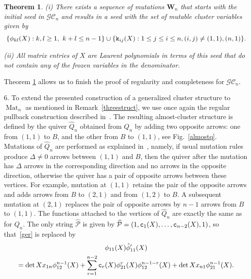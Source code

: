 \documentclass{amsart}
\newtheorem{theorem}{Theorem}
\theoremstyle{definition}
\theoremstyle{remark}
\numberwithin{equation}{section}
\numberwithin{theorem}{section}
\def\CC{{\mathcal C}}
\def\G{{\mathcal G}}
\def\P{{\mathcal P}}
\def\Ws{\mathbf W}
\def\ec{{\tt c}}
\def\ek{{\tt k}}
\def\Mat{\operatorname{Mat}}
\begin{document}
\begin{theorem}
\label{fish_to_cuttlefish}
{\rm (i)} There exists a sequence of mutations $\Ws_n$ that starts with the initial seed in $\G\CC_{n}$ and results in a seed with the set of mutable cluster variables given by 
\[
\{\phi_{kl}(X): k,l \geq 1, \ k+l \leq n-1 \}\cup \{\ek_{ij}(X) : 1\le j \leq i \leq n, (i,j)\ne (1,1), (n,1) \}.
\]

{\rm (ii)} All matrix entries of $X$ are Laurent polynomials in terms of this seed that do not contain any of the frozen variables in the denominator.
\end{theorem}


Theorem \ref{fish_to_cuttlefish} allows us to finish the proof of regularity and completeness for $\G\CC_{n}$.

6. To extend the presented construction of a generalized cluster structure to $\Mat_n$ as mentioned in Remark~\ref{threestruct}, we use once again the regular pullback construction described in~\cite{GSVpullback}. The resulting  almost-cluster structure is defined by 
the quiver $\widehat Q_n$ obtained from $Q_n$ by adding two opposite arrows: one from $(1,1)$ to $B$, and the other from $B$ to $(1,1)$, see Fig.~\ref{almostq}. 
Mutations of $\widehat Q_n$ are performed as explained 
in~\cite[Remark 4.6]{GSVpullback}, namely, if usual mutation rules produce $\Delta\ne0$ arrows between $(1,1)$ and $B$, then the quiver after the mutation has
$\Delta$ arrows in the corresponding direction and no arrows in the opposite direction, otherwise the quiver has a pair of opposite arrows between these vertices. For example, mutation at $(1,1)$ retains the pair of the opposite arrows and adds arrows from $B$ to $(2,1)$ and from $(1,2)$ to $B$. A subsequent mutation at $(2,1)$ replaces the pair of opposite arrows by $n-1$ arrows from $B$ to $(1,1)$. 
The functions attached to the vertices of $\widehat Q_n$ are exactly the same as for $Q_n$. The only string $\widehat\P$ is given by $\widehat\P=(1,\ec_1(X),\dots,\ec_{n-2}(X),1)$, so that~\eqref{ger} is replaced by
\begin{multline*}
\phi_{11}(X)\hat\phi'_{11}(X)\\
=\det Xx_{1n}\phi_{12}^{n-1}(X)+\sum_{r=1}^{n-2}\ec_r(X)\phi_{21}^r(X)\phi_{12}^{n-1-r}(X)
+\det Xx_{n1}\phi_{21}^{n-1}(X).
\end{multline*}
\end{document}
